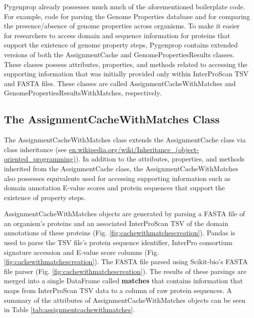 Pygenprop already possesses much much of the aforementioned boilerplate code. For example, code for parsing the Genome Properties database and for comparing the presence/absence of genome properties across organisms. To make it easier for researchers to access domain and sequence information for proteins that support the existence of genome property steps, Pygenprop contains extended versions of both the AssignmentCache and GenomePropertiesResults classes. These classes possess attributes, properties, and methods related to accessing the supporting information that was initially provided only within InterProScan TSV and FASTA files. These classes are called AssignmentCacheWithMatches and GenomePropertiesResultsWithMatches, respectively.

\subsection{The AssignmentCacheWithMatches Class}

The AssignmentCacheWithMatches class extends the AssignmentCache class via class inheritance \cite{snyder1986encapsulation} (see \href{en.wikipedia.org/wiki/Inheritance\_(object-oriented\_programming)}{en.wikipedia.org/wiki/Inheritance\_(object-oriented\_programming)}). In addition to the attributes, properties, and methods inherited from the AssignmentCache class, the AssignmentCacheWithMatches also possesses equivalents used for accessing supporting information such as domain annotation E-value scores and protein sequences that support the existence of property steps.

AssignmentCacheWithMatches objects are generated by parsing a FASTA file \cite{pearson19905} of an organism's proteins and an associated InterProScan TSV of the domain annotations of these proteins (Fig. \ref{fig:cachewithmatchescreation}). Pandas is used to parse the TSV file's protein sequence identifier, InterPro consortium signature accession and E-value score columns (Fig. \ref{fig:cachewithmatchescreation}). The FASTA file parsed using Scikit-bio's FASTA file parser (Fig. \ref{fig:cachewithmatchescreation})\cite{scikitbio}. The results of these parsings are merged into a single DataFrame called \textbf{matches} that contains information that maps from InterProScan TSV data to a column of raw protein sequences. A summary of the attributes of AssignmentCacheWithMatches objects can be seen in Table \ref{tab:assignmentcachewithmatches}.

